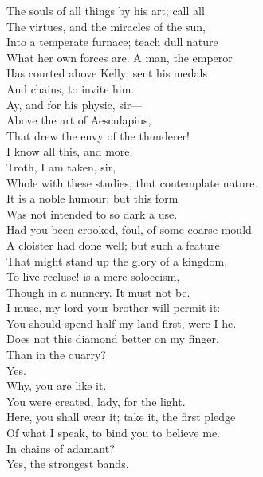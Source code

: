 \documentclass[a4paper,oneside]{memoir}
\begin{document}
\begin{drama*}
The souls of all things by his art; call all\\
The virtues, and the miracles of the sun,\\
Into a temperate furnace; teach dull nature\\
What her own forces are. A man, the emperor\\
Has courted above Kelly; sent his medals\\
And chains, to invite him.\\
\dolspeaks {} Ay, and for his physic, sir---\\
\mammonspeaks Above the art of Aesculapius,\\
That drew the envy of the thunderer!\\
I know all this, and more.\\
\dolspeaks {} Troth, I am taken, sir,\\
Whole with these studies, that contemplate nature.\\
\mammonspeaks It is a noble humour; but this form\\
Was not intended to so dark a use.\\
Had you been crooked, foul, of some coarse mould\\
A cloister had done well; but such a feature\\
That might stand up the glory of a kingdom,\\
To live recluse! is a mere soloecism,\\
Though in a nunnery. It must not be.\\
I muse, my lord your brother will permit it:\\
You should spend half my land first, were I he.\\
Does not this diamond better on my finger,\\
Than in the quarry?\\
\dolspeaks {} Yes.\\
\mammonspeaks {} Why, you are like it.\\
You were created, lady, for the light.\\
Here, you shall wear it; take it, the first pledge\\
Of what I speak, to bind you to believe me.\\
\dolspeaks In chains of adamant?\\
\mammonspeaks {} Yes, the strongest bands.\\

\end{drama*}
\end{document}
